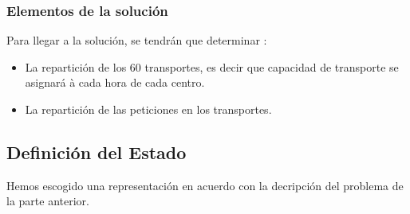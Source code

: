 \documentclass{article}
\begin{document}
\subsubsection{Elementos de la solución}
Para llegar a la solución, se tendrán que determinar :
\begin{itemize}
\item La repartición de los 60 transportes, es decir que capacidad de transporte
se asignará à cada hora de cada centro.
\item La repartición de las peticiones en los transportes.
\end{itemize}

\subsection{Definición del Estado}
Hemos escogido una representación en acuerdo con la decripción del problema de
la parte anterior.
\end{document}
